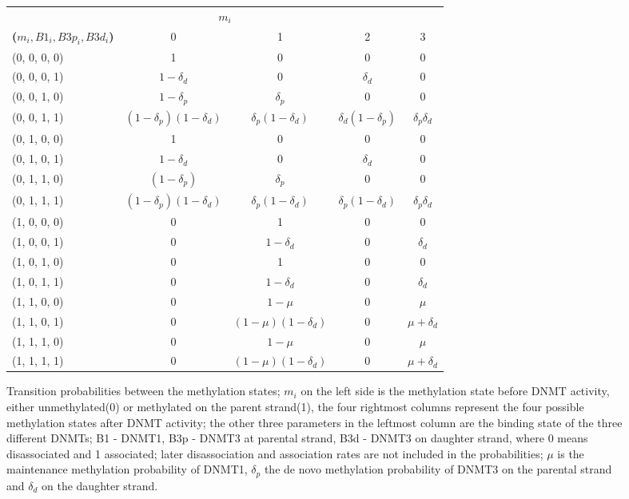 \begin{figure}[h]
\begin{tabularx}{\textwidth}{l|c|c|c|c}
\multicolumn{5}{c}{\textbf{$m_i$}}\\
\cline{2-5}
\textbf{($m_i, B1_i, B3p_i, B3d_i$)}&	0&	1&	2&	3\\
\hline
(0, 0, 0, 0)&	1&	0&	0&	0\\
(0, 0, 0, 1)&	$1-\delta_d$&	0&	$\delta_d$&	0\\
(0, 0, 1, 0)&	$1-\delta_p$&	$\delta_p$&	0&	0\\
(0, 0, 1, 1)&	$(1-\delta_p)(1-\delta_d)$&	$\delta_p(1-\delta_d)$&	$\delta_d(1-\delta_p)$&	$\delta_p \delta_d$\\
(0, 1, 0, 0)&	1&	0&	0&	0\\
(0, 1, 0, 1)&	$1-\delta_d$&	0&	$\delta_d$&	0\\
(0, 1, 1, 0)&	$(1-\delta_p)$&	$\delta_p$&	0& 0\\
(0, 1, 1, 1)&	$(1-\delta_p)(1-\delta_d)$&	$\delta_p(1-\delta_d)$&	$\delta_p(1-\delta_d)$&	$\delta_p \delta_d$\\
(1, 0, 0, 0)&	0&	1&	0&	0\\
(1, 0, 0, 1)&	0&	$1-\delta_d$&	0&	$\delta_d$\\
(1, 0, 1, 0)&	0&	1&	0&	0\\
(1, 0, 1, 1)&	0&	$1-\delta_d$&	0&	$\delta_d$\\
(1, 1, 0, 0)&	0&	$1-\mu$&	0&	$\mu$\\
(1, 1, 0, 1)&	0&	$(1-\mu)(1-\delta_d)$&	0&	$\mu+\delta_d$\\
(1, 1, 1, 0)&	0&	$1-\mu$&	0& $\mu$\\
(1, 1, 1, 1)&	0&	$(1-\mu)(1-\delta_d)$&	0&	$\mu+\delta_d$\\
\end{tabularx}
\caption{Transition probabilities between the methylation states; $m_i$ on the left side is the methylation state before DNMT activity, either unmethylated(0) or methylated on the parent strand(1), the four rightmost columns represent the four possible methylation states after DNMT activity; the other three parameters in the leftmost column are the binding state of the three different DNMTs; B1 - DNMT1, B3p - DNMT3 at parental strand, B3d - DNMT3 on daughter strand, where 0 means disassociated and 1 associated; later disassociation and association rates are not included in the probabilities; $\mu$ is the maintenance methylation probability of DNMT1, $\delta_p$ the de novo methylation probability of DNMT3 on the parental strand and $\delta_d$ on the daughter strand.}
\label{allProbs}
\end{figure}
